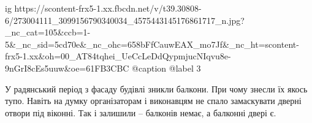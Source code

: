  
 
 
 
 

\ifcmt
  ig https://scontent-frx5-1.xx.fbcdn.net/v/t39.30808-6/273004111_3099156790340034_4575443145176861717_n.jpg?_nc_cat=105&ccb=1-5&_nc_sid=5cd70e&_nc_ohc=658bFfCauwEAX_mo7Jf&_nc_ht=scontent-frx5-1.xx&oh=00_AT84tqhei_UeCcLeDdQypmjucNIqvu8e-9nGrI8cEs5uuw&oe=61FB3CBC
  @caption @label 3
\fi


У радянський період з фасаду будівлі зникли балкони. При чому знесли їх якось
тупо. Навіть на думку організаторам і виконавцям не спало замаскувати дверні
отвори під віконні. Так і залишили – балконів немає, а балконні двері є.
